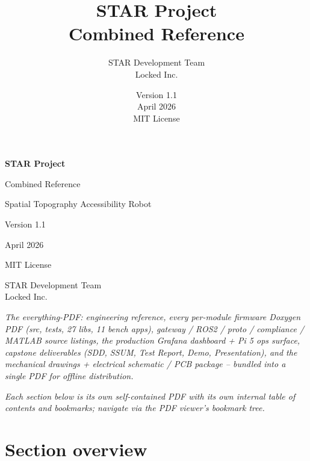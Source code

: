 \documentclass[11pt,letterpaper]{article}
\title{\Huge\bfseries STAR Project\\[0.4em]\Large Combined Reference}
\author{STAR Development Team \\ Locked Inc.}
\date{Version 1.1 \\ April 2026 \\ MIT License}
\begin{document}
\begin{titlepage}
\centering
\vspace*{2.5cm}

{\Huge\bfseries STAR Project\par}
\vspace{0.3cm}
{\LARGE Combined Reference\par}
\vspace{0.5cm}
{\large Spatial Topography Accessibility Robot\par}

\vfill

{\large Version 1.1\par}
{\large April 2026\par}
\vspace{0.4cm}
{\large MIT License\par}

\vfill

{\normalsize STAR Development Team\\Locked Inc.\par}
\vspace{0.8cm}

{\small\itshape The everything-PDF: engineering reference, every per-module
firmware Doxygen PDF (src, tests, 27 libs, 11 bench apps), gateway / ROS2 /
proto / compliance / MATLAB source listings, the production Grafana dashboard
+ Pi 5 ops surface, capstone deliverables (SDD, SSUM, Test Report, Demo,
Presentation), and the mechanical drawings + electrical schematic / PCB
package -- bundled into a single PDF for offline distribution.\par}

\vfill

{\footnotesize\itshape Each section below is its own self-contained PDF with
its own internal table of contents and bookmarks; navigate via the PDF
viewer's bookmark tree.\par}
\end{titlepage}

\section*{Section overview}
\end{document}
